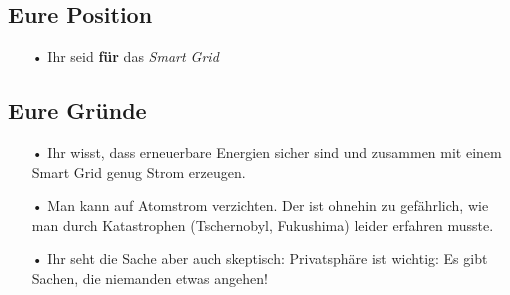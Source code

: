 \documentclass[11pt,a4paper,DIV=10,parskip=half,BCOR=0mm]{scrartcl}
\begin{document}
\subsection*{Eure Position}
\begin{enumerate}
	\item[•]Ihr seid \textbf{für} das \textit{Smart Grid}
\end{enumerate}
\subsection*{Eure Gründe}
\begin{enumerate}
	\item[•]Ihr wisst, dass erneuerbare Energien sicher sind und zusammen mit einem Smart Grid genug Strom erzeugen.
	\item[•]Man kann auf Atomstrom verzichten. Der ist ohnehin zu gefährlich, wie man durch 
	Katastrophen (Tschernobyl, Fukushima) leider erfahren musste. 
	\item[•] Ihr seht die Sache aber auch skeptisch: \glqq Privatsphäre ist wichtig: Es gibt Sachen, die niemanden etwas angehen!\grqq
	

\end{enumerate}
\end{document}
